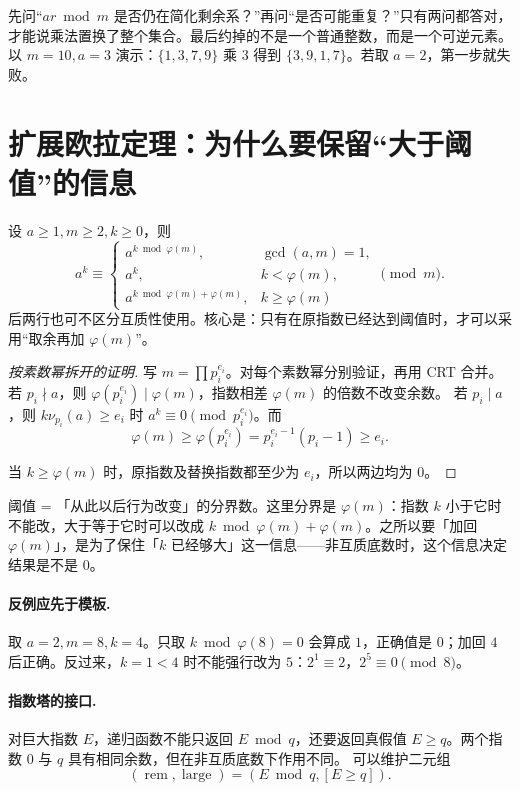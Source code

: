 \documentclass[UTF8,a4paper,11pt,oneside,openany,fontset=fandol]{ctexbook}
\theoremstyle{definition}
\newcommand{\iva}[1]{\left[#1\right]}
\begin{document}
\begin{teach}[证明中的两个关卡]
先问“$ar\bmod m$ 是否仍在简化剩余系？”再问“是否可能重复？”只有两问都答对，才能说乘法置换了整个集合。最后约掉的不是一个普通整数，而是一个可逆元素。
以 $m=10,a=3$ 演示：$\{1,3,7,9\}$ 乘 $3$ 得到 $\{3,9,1,7\}$。若取 $a=2$，第一步就失败。
\end{teach}


\section{扩展欧拉定理：为什么要保留“大于阈值”的信息}
设 $a\ge1,m\ge2,k\ge0$，则
\[
 a^k\equiv
 \begin{cases}
 a^{k\bmod\varphi(m)},&\gcd(a,m)=1,\\
 a^k,&k<\varphi(m),\\
 a^{k\bmod\varphi(m)+\varphi(m)},&k\ge\varphi(m)
 \end{cases}\pmod m.
\]
后两行也可不区分互质性使用。核心是：只有在原指数已经达到阈值时，才可以采用“取余再加 $\varphi(m)$”。


\begin{proof}[按素数幂拆开的证明]
写 $m=\prod p_i^{e_i}$。对每个素数幂分别验证，再用 CRT 合并。
若 $p_i\nmid a$，则 $\varphi(p_i^{e_i})\mid\varphi(m)$，指数相差 $\varphi(m)$ 的倍数不改变余数。
若 $p_i\mid a$，则 $k\nu_{p_i}(a)\ge e_i$ 时 $a^k\equiv0\pmod{p_i^{e_i}}$。而
\[
\varphi(m)\ge\varphi(p_i^{e_i})=p_i^{e_i-1}(p_i-1)\ge e_i.
\]


当 $k\ge\varphi(m)$ 时，原指数及替换指数都至少为 $e_i$，所以两边均为 $0$。
\end{proof}

\begin{tip}[阈值这个词]
阈值 = 「从此以后行为改变」的分界数。这里分界是 $\varphi(m)$：指数 $k$ 小于它时不能改，大于等于它时可以改成 $k\bmod\varphi(m)+\varphi(m)$。之所以要「加回 $\varphi(m)$」，是为了保住「$k$ 已经够大」这一信息——非互质底数时，这个信息决定结果是不是 $0$。
\end{tip}


\paragraph{反例应先于模板.} 取 $a=2,m=8,k=4$。只取 $k\bmod\varphi(8)=0$ 会算成 $1$，正确值是 $0$；加回 $4$ 后正确。反过来，$k=1<4$ 时不能强行改为 $5$：$2^1\equiv2$，$2^5\equiv0\pmod8$。

\paragraph{指数塔的接口.} 对巨大指数 $E$，递归函数不能只返回 $E\bmod q$，还要返回真假值 $E\ge q$。两个指数 $0$ 与 $q$ 具有相同余数，但在非互质底数下作用不同。
可以维护二元组
\[
 (\operatorname{rem},\operatorname{large})=(E\bmod q,\iva{E\ge q}).
\]
\end{document}
